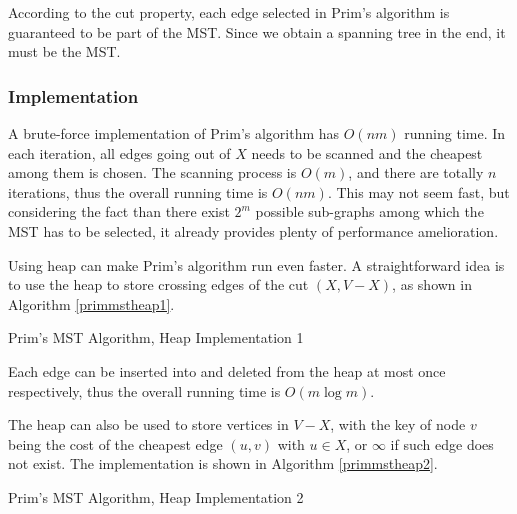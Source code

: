 According to the cut property, each edge selected in Prim's algorithm is guaranteed to be part of the MST. Since we obtain a spanning tree in the end, it must be the MST. 
\subsubsection{Implementation}
A brute-force implementation of Prim's algorithm has $O(nm)$ running time. In each iteration, all edges going out of $X$ needs to be scanned and the cheapest among them is chosen. The scanning process is $O(m)$, and there are totally $n$ iterations, thus the overall running time is $O(nm)$. This may not seem fast, but considering the fact than there exist $2^m$ possible sub-graphs among which the MST has to be selected, it already provides plenty of performance amelioration.

Using heap can make Prim's algorithm run even faster. A straightforward idea is to use the heap to store crossing edges of the cut $(X,V-X)$, as shown in Algorithm \ref{primmstheap1}.
\begin{algorithm}[ht]
\caption{Prim's MST Algorithm, Heap Implementation 1}\label{primmstheap1}
\begin{algorithmic}[1]
\EndIf
\EndFor
\EndWhile
\end{algorithmic}
\end{algorithm}
Each edge can be inserted into and deleted from the heap at most once respectively, thus the overall running time is $O(m\log m)$. 

The heap can also be used to store vertices in $V-X$, with the key of node $v$ being the cost of the cheapest edge $(u,v)$ with $u\in X$, or $\infty$ if such edge does not exist. The implementation is shown in Algorithm \ref{primmstheap2}.
\begin{algorithm}[ht]
\caption{Prim's MST Algorithm, Heap Implementation 2}\label{primmstheap2}
\begin{algorithmic}[1]
\EndIf
\EndFor
\EndWhile
\end{algorithmic}
\end{algorithm}


